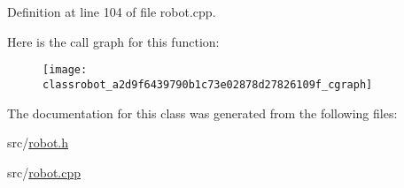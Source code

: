Definition at line 104 of file robot.\-cpp.



Here is the call graph for this function\-:
\nopagebreak
\begin{figure}[H]
\begin{center}
\leavevmode
\texttt{[image: classrobot\_a2d9f6439790b1c73e02878d27826109f\_cgraph]}
\end{center}
\end{figure}




The documentation for this class was generated from the following files\-:\begin{DoxyCompactItemize}
\item 
src/\hyperlink{robot_8h}{robot.\-h}\item 
src/\hyperlink{robot_8cpp}{robot.\-cpp}\end{DoxyCompactItemize}

